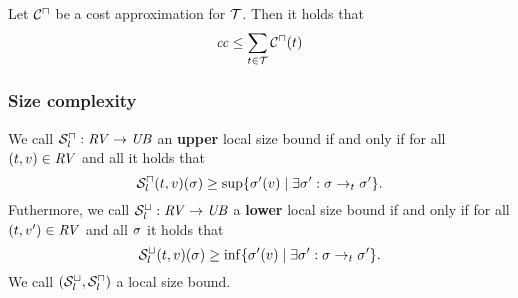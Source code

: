 \begin{theorem}
	Let ${\mathcal{C}^\sqcap}$ be a cost approximation for $\mathcal{T}$.
	Then it holds that 
	\[ \mathit{cc} \leq \sum_{t \in \mathcal{T}} {\mathcal{C}^\sqcap}(t) \]
\end{theorem}

\subsubsection{Size complexity}


\begin{definition}
  We call ${\mathcal{S}^\sqcap_l}: \mathit{RV} \rightarrow \mathit{UB}$ an \textbf{upper} local size bound if and only if for all $(t, v) \in \mathit{RV}$ and all  it holds that
  \[ {\mathcal{S}^\sqcap_l}(t, v)(\sigma) \geq \sup \lbrace \sigma'(v) \mid \exists \sigma': \sigma \rightarrow_t \sigma' \rbrace. \]
  Futhermore, we call ${\mathcal{S}^\sqcup_l}: \mathit{RV} \rightarrow \mathit{UB}$ a \textbf{lower} local size bound if and only if for all $(t, v') \in \mathit{RV}$ and all $\sigma$ it holds that
  \[ {\mathcal{S}^\sqcup_l}(t, v)(\sigma) \geq \inf \lbrace \sigma'(v) \mid \exists \sigma': \sigma \rightarrow_t \sigma' \rbrace. \]
  We call ${({\mathcal{S}^\sqcup_l}, {\mathcal{S}^\sqcap_l})}$ a local size bound.
\end{definition}

